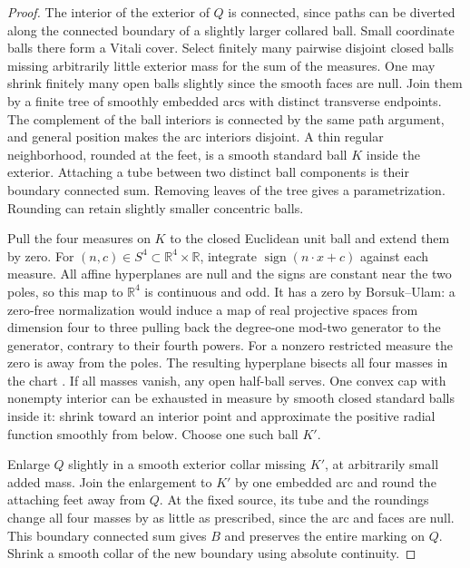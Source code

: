 \begin{proof}
The interior of the exterior of \(Q\) is connected, since paths
can be diverted along the connected boundary of a slightly larger
collared ball. Small coordinate balls there form a Vitali cover.
Select finitely many pairwise disjoint closed balls missing arbitrarily
little exterior mass for the sum of the measures. One may shrink
finitely many open balls slightly since the smooth faces are null.
Join them by a finite tree of smoothly embedded arcs with distinct
transverse endpoints. The complement of the ball interiors is
connected by the same path argument, and general position makes the
arc interiors disjoint. A thin regular neighborhood, rounded at the
feet, is a smooth standard ball \(K\) inside the exterior. Attaching
a tube between two distinct ball components is their boundary
connected sum. Removing leaves of the tree gives a parametrization.
Rounding can retain slightly smaller concentric balls.

Pull the four measures on \(K\) to the closed Euclidean unit ball
and extend them by zero. For \((n,c)\in S^4\subset\mathbb R^4\times
\mathbb R\), integrate \(\operatorname{sign}(n\cdot x+c)\) against
each measure. All affine hyperplanes are null and the signs are
constant near the two poles, so this map to \(\mathbb R^4\) is
continuous and odd. It has a zero by Borsuk--Ulam: a zero-free
normalization would induce a map of real projective spaces from
dimension four to three pulling back the degree-one mod-two generator
to the generator, contrary to their fourth powers. For a nonzero
restricted measure the zero is away from the poles. The resulting
hyperplane bisects all four masses in the chart
\cite{StoneTukey1942Sandwich}. If all masses vanish, any open
half-ball serves. One convex cap with nonempty interior can be
exhausted in measure by smooth closed standard balls inside it:
shrink toward an interior point and approximate the positive radial
function smoothly from below. Choose one such ball \(K'\).

Enlarge \(Q\) slightly in a smooth exterior collar missing \(K'\),
at arbitrarily small added mass. Join the enlargement to \(K'\) by
one embedded arc and round the attaching feet away from \(Q\).
At the fixed source, its tube and the roundings change all four
masses by as little as prescribed, since the arc and faces are null.
This boundary connected sum gives \(B\) and preserves the entire
marking on \(Q\). Shrink a smooth collar of the new boundary using
absolute continuity.
\end{proof}

